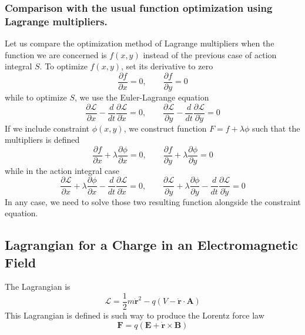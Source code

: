 \documentclass[../../../main.tex]{subfiles}
\begin{document}
\subsubsection*{Comparison with the usual function optimization using Lagrange multipliers.}
Let us compare the optimization method of Lagrange multipliers when the function we are concerned is $f(x,y)$ instead of the previous case of action integral $S$.
To optimize $f(x,y)$, set its derivative to zero
\begin{equation*}
	\frac{\partial f}{\partial x}=0,\qquad\frac{\partial f}{\partial y}=0
\end{equation*}
while to optimize $S$, we use the Euler-Lagrange equation
\begin{equation*}
	\frac{\partial \mathcal{L}}{\partial x}-\frac{d}{dt}\frac{\partial\mathcal{L}}{\partial\dot{x}}=0,\qquad\frac{\partial\mathcal{L}}{\partial y}-\frac{d}{dt}\frac{\partial \mathcal{L}}{\partial \dot{y}}=0
\end{equation*}
If we include constraint $\phi(x,y)$, we construct function $F=f+\lambda\phi$ such that the multipliers is defined
\begin{equation*}
	\frac{\partial f}{\partial x}+\lambda\frac{\partial \phi}{\partial x}=0,\qquad\frac{\partial f}{\partial y}+\lambda\frac{\partial \phi}{\partial y}=0
\end{equation*}
while in the action integral case
\begin{equation*}
	\frac{\partial \mathcal{L}}{\partial x}+\lambda\frac{\partial\phi}{\partial x}-\frac{d}{dt}\frac{\partial\mathcal{L}}{\partial\dot{x}}=0,
	\qquad\frac{\partial\mathcal{L}}{\partial y}+\lambda\frac{\partial\phi}{\partial y}-\frac{d}{dt}\frac{\partial \mathcal{L}}{\partial \dot{y}}=0
\end{equation*}
In any case, we need to solve those two resulting function alongside the constraint equation.

\subsection*{Lagrangian for a Charge in an Electromagnetic Field}
The Lagrangian is 
\begin{equation*}
	\mathcal{L}=\frac{1}{2}m\dot{\mathbf{r}}^2-q(V-\dot{\mathbf{r}}\cdot \mathbf{A})
\end{equation*}
This Lagrangian is defined is such way to produce the Lorentz force law
\begin{equation*}
	\mathbf{F}=q \left( \mathbf{E}+\dot{\mathbf{r}}\times \mathbf{B} \right) 
\end{equation*}
\end{document}
